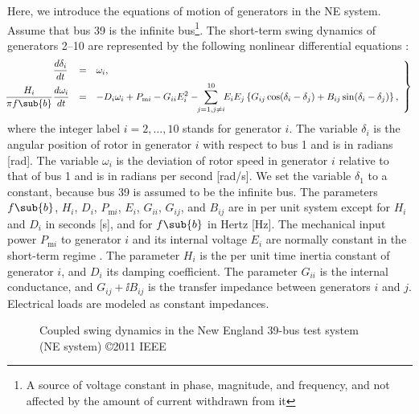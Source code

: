 \documentclass[a4paper,10pt]{article}
\begin{document}
%
Here, we introduce the equations of motion of generators in the NE system.  
Assume that bus 39 is the infinite bus\footnote{A source of voltage constant in phase, magnitude, and frequency, and not affected by the amount of current withdrawn from it}.  
The short-term swing dynamics of generators 2--10 are represented by the following nonlinear differential equations \cite{Machowski:1997}: 
\begin{equation}
\makebox[-1.0em]{}\left.
\begin{array}{rcl}
{\displaystyle \frac{d\delta_i}{dt}\,}
&=& 
\omega_i,
\\\noalign{\vskip +1mm}
{\displaystyle \frac{H_i}{\pi f\sub{b}}\frac{d\omega_i}{dt}} 
&=& 
{\displaystyle -D_i\omega_i+P_{\mathrm{m}i}-G_{ii}E^2_i
-\!\!\sum_{j=1,j\neq i}^{10}\!\!
E_iE_j\left\{G_{ij}\cos(\delta_i-\delta_j)+B_{ij}\sin(\delta_i-\delta_j)\right\},
}
\end{array}
\right\}
\label{eqn:classical_NEsystem}
\end{equation}
where the integer label $i=2,\ldots,10$ stands for generator $i$.  
The variable $\delta_i$ is the angular position of rotor in generator $i$ with respect to bus 1 and is in radians [rad].  
The variable $\omega_i$ is the deviation of rotor speed in generator $i$ relative to that of bus 1 and is in radians per second [rad/s].  
We set the variable $\delta_1$ to a constant, because bus 39 is assumed to be the infinite bus.  
The parameters $f\sub{b}$, $H_i$, $D_i$, $P_{\mathrm{m}i}$, $E_i$, $G_{ii}$, $G_{ij}$, and $B_{ij}$ are in per unit system except for $H_i$ and $D_i$ in seconds [s], and for $f\sub{b}$ in Hertz [Hz].  
The mechanical input power $P_{\mathrm{m}i}$ to generator $i$ and its internal voltage $E_i$ are normally constant in the short-term regime \cite{Machowski:1997}.  
The parameter $H_i$ is the per unit time inertia constant of generator $i$, and $D_i$ its damping coefficient.  
The parameter $G_{ii}$ is the internal conductance, and $G_{ij}+\ii B_{ij}$ is the transfer impedance between generators $i$ and $j$.  
Electrical loads are modeled as constant impedances.  

%
\begin{figure*}[t] %
\centering
{}%
%
\hspace*{4mm}
%
%
\caption{%
Coupled swing dynamics in the New England 39-bus test system (NE system) 
\copyright 2011 IEEE
}
\end{figure*}
\end{document}
